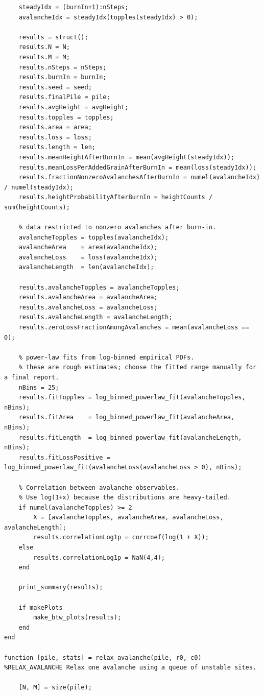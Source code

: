 \documentclass{article}
\begin{document}
\begin{lstlisting}
    steadyIdx = (burnIn+1):nSteps;
    avalancheIdx = steadyIdx(topples(steadyIdx) > 0);

    results = struct();
    results.N = N;
    results.M = M;
    results.nSteps = nSteps;
    results.burnIn = burnIn;
    results.seed = seed;
    results.finalPile = pile;
    results.avgHeight = avgHeight;
    results.topples = topples;
    results.area = area;
    results.loss = loss;
    results.length = len;
    results.meanHeightAfterBurnIn = mean(avgHeight(steadyIdx));
    results.meanLossPerAddedGrainAfterBurnIn = mean(loss(steadyIdx));
    results.fractionNonzeroAvalanchesAfterBurnIn = numel(avalancheIdx) / numel(steadyIdx);
    results.heightProbabilityAfterBurnIn = heightCounts / sum(heightCounts);

    % data restricted to nonzero avalanches after burn-in.
    avalancheTopples = topples(avalancheIdx);
    avalancheArea    = area(avalancheIdx);
    avalancheLoss    = loss(avalancheIdx);
    avalancheLength  = len(avalancheIdx);

    results.avalancheTopples = avalancheTopples;
    results.avalancheArea = avalancheArea;
    results.avalancheLoss = avalancheLoss;
    results.avalancheLength = avalancheLength;
    results.zeroLossFractionAmongAvalanches = mean(avalancheLoss == 0);

    % power-law fits from log-binned empirical PDFs.
    % these are rough estimates; choose the fitted range manually for a final report.
    nBins = 25;
    results.fitTopples = log_binned_powerlaw_fit(avalancheTopples, nBins);
    results.fitArea    = log_binned_powerlaw_fit(avalancheArea, nBins);
    results.fitLength  = log_binned_powerlaw_fit(avalancheLength, nBins);
    results.fitLossPositive = log_binned_powerlaw_fit(avalancheLoss(avalancheLoss > 0), nBins);

    % Correlation between avalanche observables.
    % Use log(1+x) because the distributions are heavy-tailed.
    if numel(avalancheTopples) >= 2
        X = [avalancheTopples, avalancheArea, avalancheLoss, avalancheLength];
        results.correlationLog1p = corrcoef(log(1 + X));
    else
        results.correlationLog1p = NaN(4,4);
    end

    print_summary(results);

    if makePlots
        make_btw_plots(results);
    end
end

function [pile, stats] = relax_avalanche(pile, r0, c0)
%RELAX_AVALANCHE Relax one avalanche using a queue of unstable sites.

    [N, M] = size(pile);


\end{lstlisting}
\end{document}
